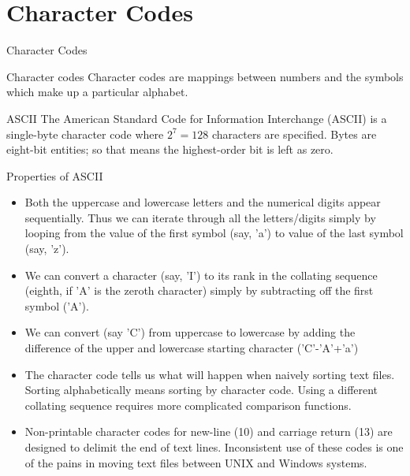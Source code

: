 \documentclass{beamer}
\begin{document}
\section{Character Codes}
\begin{frame}{Character Codes}
  \begin{alertblock}{Character codes}
    Character codes are mappings between numbers and the symbols which make up a particular alphabet.
  \end{alertblock}
  \begin{block}{ASCII}
    The American Standard Code for Information Interchange (ASCII) is a single-byte character code where $2^7 = 128$ characters are specified.
    Bytes are eight-bit entities; so that means the highest-order bit is left as zero.

  \end{block}


\end{frame}

\begin{frame}{Properties of ASCII}
  \begin{itemize}
  \item Both the uppercase and lowercase letters and the numerical digits appear sequentially. Thus we can iterate through all the letters/digits simply by looping from the value of the first symbol (say, 'a') to value of the last symbol (say, 'z').
  \item We can convert a character (say, 'I') to its rank in the collating sequence (eighth, if 'A' is the zeroth character) simply by subtracting off the first symbol ('A').
  \item We can convert (say 'C') from uppercase to lowercase by adding the difference of the upper and lowercase starting character ('C'-'A'+'a')
  \item The character code tells us what will happen when naively sorting text files. Sorting alphabetically means sorting by character code. Using a different collating sequence requires more complicated comparison functions.
  \item Non-printable character codes for new-line (10) and carriage return (13) are designed to delimit the end of text lines.
    Inconsistent use of these codes is one of the pains in moving text files between UNIX and Windows systems.
 \end{itemize}
\end{frame}
\end{document}
